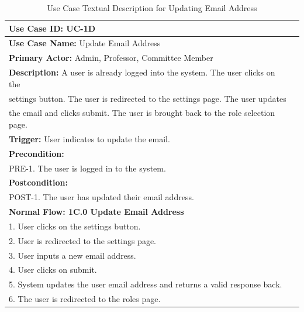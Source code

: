 \documentclass[fontsize=12pt,paper=letter,twoside]{scrartcl}
\begin{document}
\begin{table}[!htb]
\begin{center}
\begin{tabular}{|l|l|}
\hline
\textbf{Use Case ID:} UC-1D \\ \hline
\textbf{Use Case Name:} Update Email Address \\ \hline
\textbf {Primary Actor:} Admin, Professor, Committee Member\\ \hline
\textbf{Description:} A user is already logged into the system. The user clicks on the \\ settings button. The user is redirected to the settings page. The user updates \\ the email and clicks submit. The user is brought back to the role selection page.\\ \hline
\textbf{Trigger:} User indicates to update the email.\\ \hline
\textbf{Precondition:}
\\ PRE-1. The user is logged in to the system.\\ \hline
\textbf{Postcondition:}
\\ POST-1. The user has updated their email address.\\ \hline
\textbf{Normal Flow: 1C.0 Update Email Address}
\\ 1. User clicks on the settings button.
\\ 2. User is redirected to the settings page.
\\ 3. User inputs a new email address.
\\ 4. User clicks on submit.
\\ 5. System updates the user email address and returns a valid response back.
\\ 6. The user is redirected to the roles page.\\ \hline
\end{tabular}
\end{center}
\caption {Use Case Textual Description for Updating Email Address}
\label{tbl:uc1Dtd}
\end{table}

\clearpage
\newpage
\end{document}
